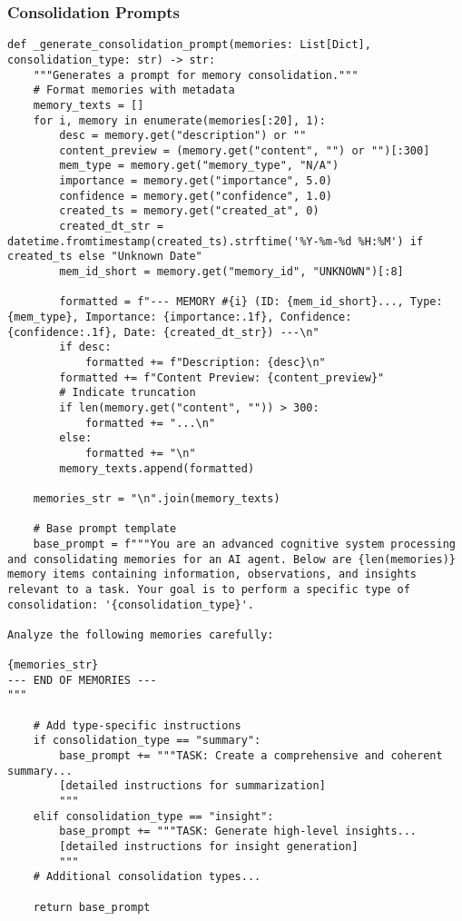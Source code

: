 \documentclass[12pt,a4paper]{article}
\begin{document}
\subsubsection*{Consolidation Prompts}
\begin{pageablecode}
\begin{verbatim}
def _generate_consolidation_prompt(memories: List[Dict], consolidation_type: str) -> str:
    """Generates a prompt for memory consolidation."""
    # Format memories with metadata
    memory_texts = []
    for i, memory in enumerate(memories[:20], 1):
        desc = memory.get("description") or ""
        content_preview = (memory.get("content", "") or "")[:300]
        mem_type = memory.get("memory_type", "N/A")
        importance = memory.get("importance", 5.0)
        confidence = memory.get("confidence", 1.0)
        created_ts = memory.get("created_at", 0)
        created_dt_str = datetime.fromtimestamp(created_ts).strftime('%Y-%m-%d %H:%M') if created_ts else "Unknown Date"
        mem_id_short = memory.get("memory_id", "UNKNOWN")[:8]

        formatted = f"--- MEMORY #{i} (ID: {mem_id_short}..., Type: {mem_type}, Importance: {importance:.1f}, Confidence: {confidence:.1f}, Date: {created_dt_str}) ---\n"
        if desc:
            formatted += f"Description: {desc}\n"
        formatted += f"Content Preview: {content_preview}"
        # Indicate truncation
        if len(memory.get("content", "")) > 300:
            formatted += "...\n"
        else:
            formatted += "\n"
        memory_texts.append(formatted)

    memories_str = "\n".join(memory_texts)

    # Base prompt template
    base_prompt = f"""You are an advanced cognitive system processing and consolidating memories for an AI agent. Below are {len(memories)} memory items containing information, observations, and insights relevant to a task. Your goal is to perform a specific type of consolidation: '{consolidation_type}'.

Analyze the following memories carefully:

{memories_str}
--- END OF MEMORIES ---
"""

    # Add type-specific instructions
    if consolidation_type == "summary":
        base_prompt += """TASK: Create a comprehensive and coherent summary...
        [detailed instructions for summarization]
        """
    elif consolidation_type == "insight":
        base_prompt += """TASK: Generate high-level insights...
        [detailed instructions for insight generation]
        """
    # Additional consolidation types...

    return base_prompt
\end{verbatim}
\end{pageablecode}
\end{document}
